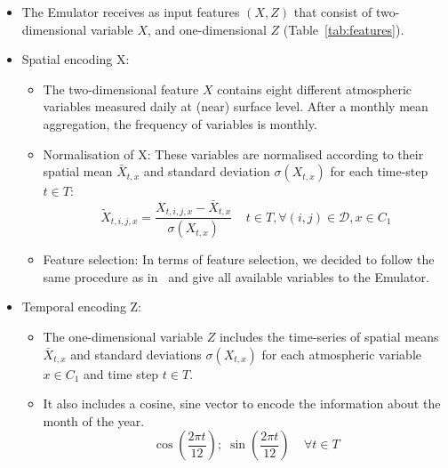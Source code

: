\documentclass[a4paper,11pt,oneside]{report}
\begin{document}
\begin{itemize}
    \item The Emulator receives as input features $(X, Z)$ that consist of two-dimensional variable $X$, and one-dimensional $Z$ (Table~\ref{tab:features}). 
    \item Spatial encoding X:
    \begin{itemize}
        \item The two-dimensional feature $X$ contains eight different atmospheric variables measured daily at (near) surface level. After a monthly mean aggregation, the frequency of variables is monthly.
         \item Normalisation of X: These variables are normalised according to their spatial mean $\bar{X}_{t,x}$ and standard deviation $\sigma(X_{t,x})$ for each time-step $t\in T$:
            \begin{equation}\label{eq:normalisation-X}
            \tilde{X}_{t,i,j,x} = \frac{X_{t,i,j,x}-\bar{X}_{t,x}}{\sigma(X_{t,x})} \;\;\;\; t\in T, \forall (i,j) \in \mathcal{D}, x\in C_1
        \end{equation}
        \item Feature selection: In terms of feature selection, we decided to follow the same procedure as in~\cite{Doury} and give all available variables to the Emulator. 

    \end{itemize}
\item Temporal encoding Z: \begin{itemize}
    \item 
The one-dimensional variable $Z$ includes the time-series of spatial means $\bar{X}_{t,x}$ and standard deviations $\sigma(X_{t,x})$ for each atmospheric variable $x\in C_1$ and time step $t\in T$.

\item It also includes a cosine, sine vector to encode the information about the month of the year.
    \begin{equation*}
       \operatorname{cos}\left(\frac{2\pi t}{12}\right);\; \operatorname{sin}\left(\frac{2\pi t}{12}\right) \;\;\;\; \forall t\in T
    \end{equation*}
    

\end{itemize}
\end{itemize}
\end{document}
